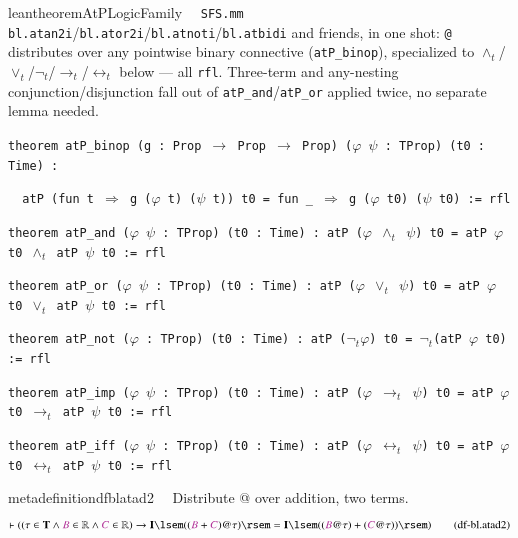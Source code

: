 \begin{restatable}{leantheorem}{AtPLogicFamily}~~ \texttt{SFS.mm} \texttt{bl.atan2i}/\texttt{bl.ator2i}/\texttt{bl.atnoti}/\texttt{bl.atbidi} and friends, in one shot: \texttt{@} distributes over any pointwise binary connective (\texttt{atP\_binop}), specialized to $\wedge_t$/$\vee_t$/$\neg_t$/$\to_t$/$\leftrightarrow_t$ below --- all \texttt{rfl}. Three-term and any-nesting conjunction/disjunction fall out of \texttt{atP\_and}/\texttt{atP\_or} applied twice, no separate lemma needed.

\texttt{\textcolor{leancolor}{theorem} \textcolor{leanyellow}{atP\_binop} (g : Prop $\to$ Prop $\to$ Prop) ($\varphi$ $\psi$ : TProp) (t0 : Time) :}

\texttt{~~atP (\textcolor{leancolor}{fun} t $\Rightarrow$ g ($\varphi$ t) ($\psi$ t)) t0 = \textcolor{leancolor}{fun} \_ $\Rightarrow$ g ($\varphi$ t0) ($\psi$ t0) := rfl}

\texttt{\textcolor{leancolor}{theorem} \textcolor{leanyellow}{atP\_and} ($\varphi$ $\psi$ : TProp) (t0 : Time) : atP ($\varphi$ $\wedge_t$ $\psi$) t0 = atP $\varphi$ t0 $\wedge_t$ atP $\psi$ t0 := rfl}

\texttt{\textcolor{leancolor}{theorem} \textcolor{leanyellow}{atP\_or} ($\varphi$ $\psi$ : TProp) (t0 : Time) : atP ($\varphi$ $\vee_t$ $\psi$) t0 = atP $\varphi$ t0 $\vee_t$ atP $\psi$ t0 := rfl}

\texttt{\textcolor{leancolor}{theorem} \textcolor{leanyellow}{atP\_not} ($\varphi$ : TProp) (t0 : Time) : atP ($\neg_t$$\varphi$) t0 = $\neg_t$(atP $\varphi$ t0) := rfl}

\texttt{\textcolor{leancolor}{theorem} \textcolor{leanyellow}{atP\_imp} ($\varphi$ $\psi$ : TProp) (t0 : Time) : atP ($\varphi$ $\to_t$ $\psi$) t0 = atP $\varphi$ t0 $\to_t$ atP $\psi$ t0 := rfl}

\texttt{\textcolor{leancolor}{theorem} \textcolor{leanyellow}{atP\_iff} ($\varphi$ $\psi$ : TProp) (t0 : Time) : atP ($\varphi$ $\leftrightarrow_t$ $\psi$) t0 = atP $\varphi$ t0 $\leftrightarrow_t$ atP $\psi$ t0 := rfl}
\label{atP_binop}
\label{atP_and}
\label{atP_or}
\label{atP_not}
\label{atP_imp}
\label{atP_iff}
\end{restatable}

\begin{restatable}{metadefinition}{dfblatad2}~~ Distribute @ over addition, two
terms.
\begin{align}
\vdash ( ( \tau \in \mathbf{T} \wedge \mc{B} \in \mathbb{R} \wedge \mc{C} \in
    \mathbb{R} ) \rightarrow \mathbf{I} \lsem ( ( \mc{B} + \mc{C} ) @ \tau )
    \rsem = \mathbf{I} \lsem ( ( \mc{B} @ \tau ) + ( \mc{C} @ \tau ) ) \rsem
    )\label{eq:df-bl.atad2}\tag{df-bl.atad2}
\end{align}
\end{restatable}


